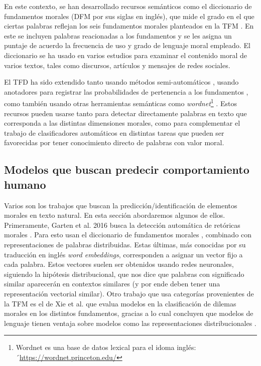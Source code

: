 \documentclass[
	spanish, %
	letterpaper, oneside
]{article}
\begin{document}
\newp En este contexto, se han desarrollado recursos semánticos como el diccionario de fundamentos morales (DFM por sus siglas en inglés), que mide el grado en el que ciertas palabras reflejan los seis fundamentos morales planteados en la TFM \cite{tfd}. En este se incluyen palabras reacionadas a los fundamentos y se les asigna un puntaje de acuerdo  la frecuencia de uso y grado de lenguaje moral empleado. El diccionario se ha usado en varios estudios para examinar el contenido moral de varios textos, tales como discursos, artículos y mensajes de redes sociales. 

\newp El TFD ha sido extendido tanto usando métodos semi-automáticos \cite{tfde}, usando anotadores para registrar las probabilidades de pertenencia a los fundamentos \cite{etfd}, como también usando otras herramientas semánticas como \textit{wordnet}\footnote{Wordnet es una base de datos lexical para el idoma inglés: ´\url{https://wordnet.princeton.edu/}} \cite{moral_strength}. Estos recursos pueden usarse tanto para detectar directamente palabras en texto que corresponda a las distintas dimensiones morales, como para complementar el trabajo de clasificadores automáticos en distintas tareas que pueden ser favorecidas por tener conocimiento directo de palabras con valor moral.


\subsection{Modelos que buscan predecir comportamiento humano}

Varios son los trabajos que buscan la predicción/identificación de elementos morales en texto natural. En esta sección abordaremos algunos de ellos. Primeramente, Garten et al. 2016 busca la detección automática de retóricas morales \cite{garten}. Para esto usan el diccionario de fundamentos morales \cite{tfd}, combinado con representaciones de palabras distribuidas. Estas últimas, más conocidas por su traducción en inglés \textit{word embeddings}, corresponden a asignar un vector fijo a cada palabra. Estos vectores suelen ser obtenidos usando redes neuronales, siguiendo la hipótesis distribucional, que nos dice que palabras con significado similar aparecerán en contextos similares (y por ende deben tener una representación vectorial similar). Otro trabajo que usa categorías provenientes de la TFM es el de Xie et al. que evalua modelos en la clasificación de dilemas morales en los distintos fundamentos, gracias a lo cual concluyen que modelos de lenguaje tienen ventaja sobre modelos como las representaciones distribucionales \cite{xie}.
\end{document}
